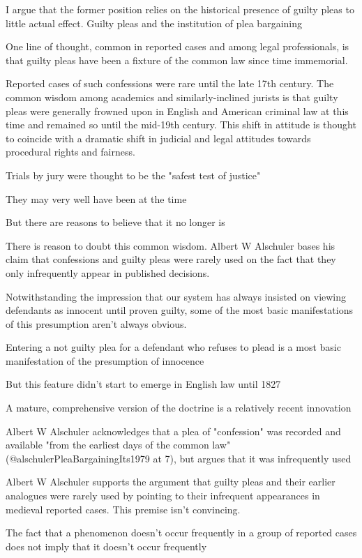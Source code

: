 I argue that the former position relies on the historical presence of guilty pleas to little actual effect. Guilty pleas and the institution of plea bargaining

One line of thought, common in reported cases and among legal professionals, is that guilty pleas have been a fixture of the common law since time immemorial.

Reported cases of such confessions were rare until the late 17th century. The common wisdom among academics and similarly-inclined jurists is that guilty pleas were generally frowned upon in English and American criminal law at this time and remained so until the mid-19th century. This shift in attitude is thought to coincide with a dramatic shift in judicial and legal attitudes towards procedural rights and fairness.

Trials by jury were thought to be the "safest test of justice"

They may very well have been at the time

But there are reasons to believe that it no longer is

There is reason to doubt this common wisdom. Albert W Alschuler bases his claim that confessions and guilty pleas were rarely used on the fact that they only infrequently appear in published decisions.

Notwithstanding the impression that our system has always insisted on viewing defendants as innocent until proven guilty, some of the most basic manifestations of this presumption aren't always obvious.

Entering a not guilty plea for a defendant who refuses to plead is a most basic manifestation of the presumption of innocence

But this feature didn't start to emerge in English law until 1827

A mature, comprehensive version of the doctrine is a relatively recent innovation

Albert W Alschuler acknowledges that a plea of "confession" was recorded and available "from the earliest days of the common law" (@alschulerPleaBargainingIts1979 at 7), but argues that it was infrequently used

Albert W Alschuler supports the argument that guilty pleas and their earlier analogues were rarely used by pointing to their infrequent appearances in medieval reported cases. This premise isn't convincing.

The fact that a phenomenon doesn't occur frequently in a group of reported cases does not imply that it doesn't occur frequently

